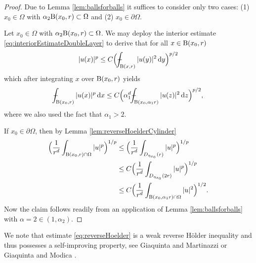 \begin{proof}

  Due to Lemma \ref{lem:ballsforballs} it suffices to consider only two cases: (1) $x_0 \in \Omega$ with $\alpha_2 \mathrm{B}(x_0,r) \subset \Omega$ and (2) $x_0 \in \partial\Omega$.

  Let $x_0 \in \Omega$ with $\alpha_2 \mathrm{B}(x_0,r) \subset \Omega$. We may deploy the interior estimate \eqref{eq:interiorEstimateDoubleLayer} to derive that for all $x \in \mathrm{B}(x_0,r)$
  \begin{align*}
    |u(x)|^p \leq C \Big( \dashint_{\BB(x,r)} |u(y)|^2 \d y \Big)^{p/2}
  \end{align*}
  which after integrating $x$ over $\mathrm{B}(x_0, r)$ yields
  \begin{align*}
    \dashint_{\BB(x_0, r)} |u(x)|^p \d x \leq C \Big(\alpha_1^d  \dashint_{\BB(x_0, \alpha_1 r)} |u(z)|^2 \d z \Big)^{p/2},
  \end{align*}
  where we also used the fact that $\alpha_1 > 2$.

  If $x_0 \in \partial\Omega$, then by Lemma \ref{lem:reverseHoelderCylinder}
  \begin{align*}
    \Big( \frac{1}{r^d} \int_{\mathrm{B}(x_0, r) \cap \Omega} |u|^p \Big)^{1/p}
    &\leq \Big( \frac{1}{r^d} \int_{D_{\eta_{x_0}}(r)} |u|^p \Big)^{1/p} \\
    &\leq C \Big( \frac{1}{r^d} \int_{D_{\eta_{x_0}}(2 r)} |u|^p \Big)^{1/p} \\
    &\leq C \Big( \frac{1}{r^d} \int_{\mathrm{B}(x_0, \alpha_1 r) \cap \Omega} |u|^2 \Big)^{1/2}.
  \end{align*}
  Now the claim follows readily from an application of Lemma \ref{lem:ballsforballs} with $\alpha = 2 \in (1, \alpha_2)$.
\end{proof}

  We note that estimate \eqref{eq:reverseHoelder} is a weak reverse H\"older inequality and thus possesses a self-improving property, see Giaquinta and Martinazzi \cite{giaquintaMartinazzi} or Giaquinta and Modica \cite{giaquintaModica}.

